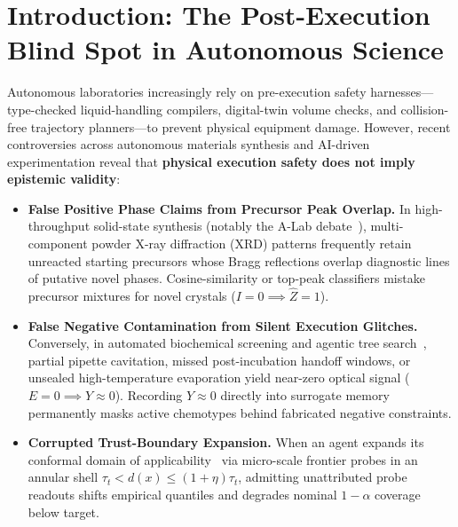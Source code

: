 \documentclass[10pt,letterpaper]{article}
\begin{document}
\clearpage

\section{Introduction: The Post-Execution Blind Spot in Autonomous Science}

Autonomous laboratories increasingly rely on pre-execution safety harnesses—type-checked liquid-handling compilers, digital-twin volume checks, and collision-free trajectory planners—to prevent physical equipment damage. However, recent controversies across autonomous materials synthesis and AI-driven experimentation reveal that \textbf{physical execution safety does not imply epistemic validity}:
\begin{itemize}[leftmargin=1.5em, itemsep=2pt, topsep=2pt]
  \item \textbf{False Positive Phase Claims from Precursor Peak Overlap.} In high-throughput solid-state synthesis (notably the A-Lab debate~\cite{szymanski2023alab,palgrave2024alabcritique}), multi-component powder X-ray diffraction (XRD) patterns frequently retain unreacted starting precursors whose Bragg reflections overlap diagnostic lines of putative novel phases. Cosine-similarity or top-peak classifiers mistake precursor mixtures for novel crystals ($I=0 \implies \hat{Z}=1$).
  \item \textbf{False Negative Contamination from Silent Execution Glitches.} Conversely, in automated biochemical screening and agentic tree search~\cite{yamada2025aiscientistv2}, partial pipette cavitation, missed post-incubation handoff windows, or unsealed high-temperature evaporation yield near-zero optical signal ($E=0 \implies Y \approx 0$). Recording $Y \approx 0$ directly into surrogate memory~\cite{martin2026memory} permanently masks active chemotypes behind fabricated negative constraints.
  \item \textbf{Corrupted Trust-Boundary Expansion.} When an agent expands its conformal domain of applicability~\cite{gibbs2021aci,narayanan2025ether0} via micro-scale frontier probes in an annular shell $\tau_t < d(x) \le (1+\eta)\tau_t$, admitting unattributed probe readouts shifts empirical quantiles and degrades nominal $1-\alpha$ coverage below target.
\end{itemize}
\end{document}
